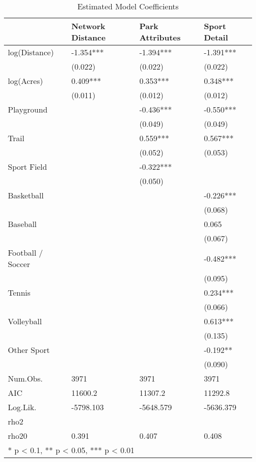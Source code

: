 \documentclass[]{elsarticle} %
\begin{document}
\begin{table}

\caption{\label{tab:base-modelsummary}Estimated Model Coefficients}
\centering
\begin{tabular}[t]{llll}
\toprule
  & Network Distance & Park Attributes & Sport Detail\\
\midrule
log(Distance) & -1.354*** & -1.394*** & -1.391***\\
 & (0.022) & (0.022) & (0.022)\\
log(Acres) & 0.409*** & 0.353*** & 0.348***\\
 & (0.011) & (0.012) & (0.012)\\
Playground &  & -0.436*** & -0.550***\\
 &  & (0.049) & (0.049)\\
Trail &  & 0.559*** & 0.567***\\
 &  & (0.052) & (0.053)\\
Sport Field &  & -0.322*** & \\
 &  & (0.050) & \\
Basketball &  &  & -0.226***\\
 &  &  & (0.068)\\
Baseball &  &  & 0.065\\
 &  &  & (0.067)\\
Football / Soccer &  &  & -0.482***\\
 &  &  & (0.095)\\
Tennis &  &  & 0.234***\\
 &  &  & (0.066)\\
Volleyball &  &  & 0.613***\\
 &  &  & (0.135)\\
Other Sport &  &  & -0.192**\\
 &  &  & (0.090)\\
\midrule
Num.Obs. & 3971 & 3971 & 3971\\
AIC & 11600.2 & 11307.2 & 11292.8\\
Log.Lik. & -5798.103 & -5648.579 & -5636.379\\
rho2 &  &  & \\
rho20 & 0.391 & 0.407 & 0.408\\
\bottomrule
\multicolumn{4}{l}{\textsuperscript{} * p < 0.1, ** p < 0.05, *** p < 0.01}\\
\end{tabular}
\end{table}
\end{document}
